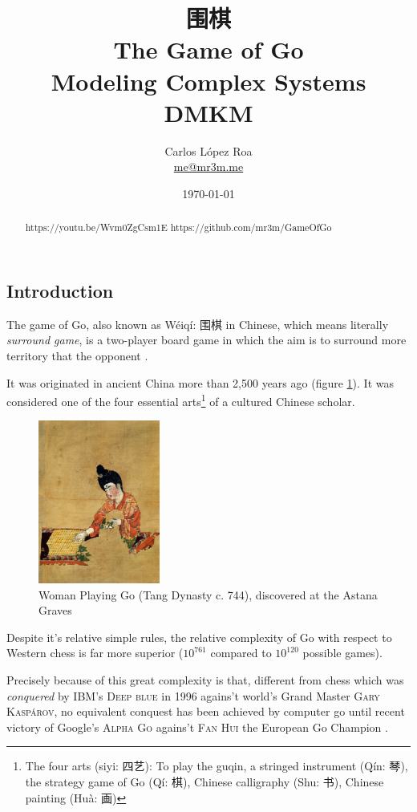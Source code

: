 \documentclass[a4paper,10pt,twocolumn]{article}
\title{围棋 \\ The Game of Go\\ \small Modeling Complex Systems\\ DMKM}
\author{Carlos López Roa\\ \href{mailto:me@mr3m.me}{me@mr3m.me}}
\date{\today}
\begin{document}
\begin{CJK*}{UTF8}{gbsn}
\maketitle
\begin{abstract}
https://youtu.be/Wvm0ZgCsm1E
https://github.com/mr3m/GameOfGo
\end{abstract}


\section{Introduction}
The game of Go, also known as {Wéiqí: 围棋} in Chinese, which means literally \emph{surround game}, is a two-player board game in which the aim is to surround more territory that the opponent \cite{Kunkle2002}.

It was originated in ancient China more than 2,500 years ago (figure \ref{l1}). It was considered one of the four essential arts\footnote{The four arts ({siyi: 四艺}): To play the guqin, a stringed instrument ({Qín:  琴}), the strategy game of Go ({Qí:  棋}), Chinese calligraphy ({Shu:  书}), Chinese painting ({Huà:  画}) } of a cultured Chinese scholar.

\begin{figure}[!ht]
\begin{center}
\includegraphics[width=4cm]{Astana.jpg}
\caption{\footnotesize{Woman Playing Go (Tang Dynasty c. 744), discovered at the Astana Graves}\label{l1}}
\end{center}
\end{figure}

Despite it's relative simple rules, the relative complexity of Go with respect to Western chess is far more superior ($10^{761}$ compared to $10^{120}$ possible games).

Precisely because of this great complexity is that, different from chess which was \emph{conquered} by IBM's \textsc{Deep blue} in 1996 agains't world's Grand Master \textsc{Gary Kaspárov}, no equivalent conquest has been achieved by computer go until recent victory of Google's \textsc{Alpha Go} agains't \textsc{Fan Hui} the European Go Champion \cite{Silver2016a}. 


\end{CJK*}
\end{document}
